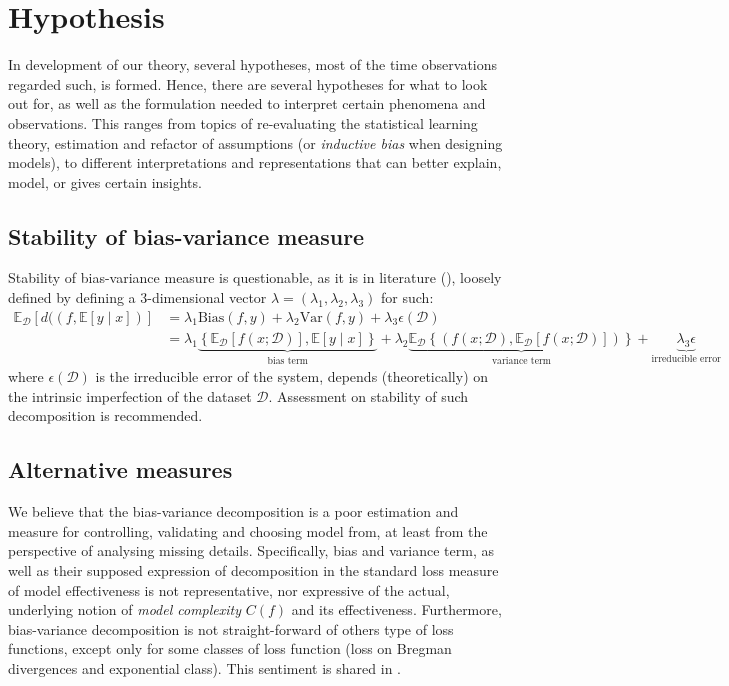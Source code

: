 \documentclass[10pt,oneside,oldfontcommands,dvipsnames,article]{memoir}
\begin{document}
\clearpage

\section{Hypothesis}

In development of our theory, several hypotheses, most of the time observations regarded such, is formed. Hence, there are several hypotheses for what to look out for, as well as the formulation needed to interpret certain phenomena and observations. This ranges from topics of re-evaluating the statistical learning theory, estimation and refactor of assumptions (or \textit{inductive bias} when designing models), to different interpretations and representations that can better explain, model, or gives certain insights.  
\subsection{Stability of bias-variance measure}
Stability of bias-variance measure is questionable, as it is in literature (\cite{domingos_unifeid_2000}), loosely defined by defining a 3-dimensional vector $\lambda=(\lambda_{1},\lambda_{2},\lambda_{3})$ for such: 
\noindent 
\begin{equation*}
        \begin{split}
            \mathbb{E}_{\mathcal{D}} \left[d((f,\mathbb{E}[y\mid x])\right] & = \lambda_{1} \mathrm{Bias}(f,y) + \lambda_{2}\mathrm{Var}(f,y)+ \lambda_{3}\epsilon(\mathcal{D})\\ 
            & = \lambda_{1}\underbrace{\left\{ \mathbb{E}_{\mathcal{D}}[f(x;\mathcal{D})] , \mathbb{E}[y\mid x] \right\}}_{\text{bias term}} +\lambda_{2} \underbrace{\mathbb{E}_{\mathcal{D}} \left\{(f(x;\mathcal{D}), \mathbb{E}_{\mathcal{D}}[f(x;\mathcal{D})])\right\}}_{\text{variance term}} +\underbrace{\lambda_{3}\epsilon}_{\text{irreducible error}}
        \end{split}
\end{equation*}
where $\epsilon(\mathcal{D})$ is the irreducible error of the system, depends (theoretically) on the intrinsic imperfection of the dataset $\mathcal{D}$. Assessment on stability of such decomposition is recommended. 
\subsection{Alternative measures}
We believe that the bias-variance decomposition is a poor estimation and measure for controlling, validating and choosing model from, at least from the perspective of analysing missing details. Specifically, bias and variance term, as well as their supposed expression of decomposition in the standard loss measure of model effectiveness is not representative, nor expressive of the actual, underlying notion of \textit{model complexity} $C(f)$ and its effectiveness. Furthermore, bias-variance decomposition is not straight-forward of others type of loss functions, except only for some classes of loss function (loss on Bregman divergences and exponential class). This sentiment is shared in \cite{brown2024biasvariance}.
\end{document}
